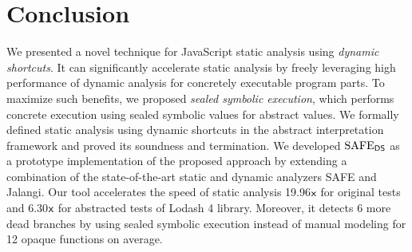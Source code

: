 \section{Conclusion}\label{sec:conclusion}
We presented a novel technique for JavaScript static analysis using \textit{dynamic shortcuts}.
It can significantly accelerate static
analysis by freely leveraging high performance of dynamic analysis for
concretely executable program parts.  To maximize such benefits,
we proposed \textit{sealed symbolic execution}, which performs
concrete execution using sealed symbolic values for abstract values.
We formally defined static analysis using dynamic shortcuts in the
abstract interpretation framework and proved its soundness and termination.
We developed $\text{SAFE}_{\textsf{DS}}$ as a prototype implementation of the proposed approach
by extending a combination of the state-of-the-art static and dynamic
analyzers SAFE and Jalangi.  Our tool accelerates the speed
of static analysis 19.96${\textsf{x}}$ for original tests and 6.30${\textsf{x}}$ for
abstracted tests of Lodash 4 library.  Moreover, it detects 6 more
dead branches by using sealed symbolic execution instead of
manual modeling for 12 opaque functions on average.
